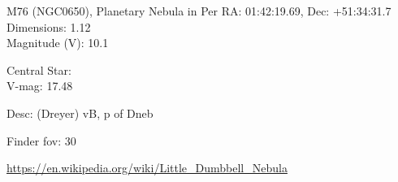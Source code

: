 \begin{block}{M76 (NGC0650), Planetary Nebula in Per}
    RA: 01:42:19.69, Dec: +51:34:31.7 \\ 
    Dimensions: 1.12 \\ 
    Magnitude (V): 10.1

    Central Star: \\ 
      \hspace{1em}V-mag: 17.48 

    Desc: (Dreyer) vB, p of Dneb 

    Finder fov: 30 

    \url{https://en.wikipedia.org/wiki/Little_Dumbbell_Nebula} 
\end{block}